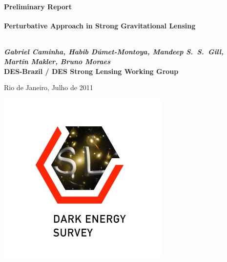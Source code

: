 \begin{titlepage}

\begin{center}



\textbf{\Large Preliminary Report  }\\[3.5cm]

\HRule \\[0.6cm]
{ \large \bfseries Perturbative Approach in Strong Gravitational Lensing}\\[0.4cm]

\HRule \\[1.0cm]

\vspace{2.0cm}

{\Large \textbf{\textit{ Gabriel Caminha, Habib D\'umet-Montoya, Mandeep S.~S.~Gill, Mart\'in Makler, Bruno Moraes}}}\\
{\large \textbf{DES-Brazil / DES Strong Lensing Working Group}}\\[1.5cm]

\vfill

{\large Rio de Janeiro, Julho de 2011}

\end{center}

\begin{flushright}
    \includegraphics[scale=0.5]{graphics/SLSG-Logo.jpg}
\end{flushright}

\end{titlepage} 
